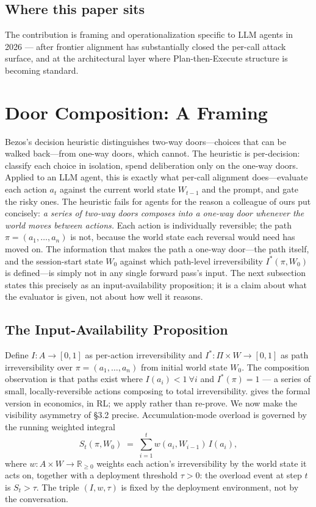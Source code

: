 \documentclass[11pt]{article}
\begin{document}
\subsection{Where this paper sits}

The contribution is framing and operationalization specific to LLM agents in 2026 --- after frontier alignment has substantially closed the per-call attack surface, and at the architectural layer where Plan-then-Execute structure is becoming standard.

\section{Door Composition: A Framing}
\label{sec:framing}

Bezos's decision heuristic distinguishes two-way doors---choices that can be walked back---from one-way doors, which cannot. The heuristic is per-decision: classify each choice in isolation, spend deliberation only on the one-way doors. Applied to an LLM agent, this is exactly what per-call alignment does---evaluate each action $a_t$ against the current world state $W_{t-1}$ and the prompt, and gate the risky ones. The heuristic fails for agents for the reason a colleague of ours put concisely: \emph{a series of two-way doors composes into a one-way door whenever the world moves between actions.} Each action is individually reversible; the path $\pi = (a_1, \ldots, a_n)$ is not, because the world state each reversal would need has moved on. The information that makes the path a one-way door---the path itself, and the session-start state $W_0$ against which path-level irreversibility $I^*(\pi, W_0)$ is defined---is simply not in any single forward pass's input. The next subsection states this precisely as an input-availability proposition; it is a claim about what the evaluator is given, not about how well it reasons.

\subsection{The Input-Availability Proposition}
\label{sec:input-availability}

Define $I: A \to [0, 1]$ as per-action irreversibility and $I^*: \Pi \times W \to [0, 1]$ as path irreversibility over $\pi = (a_1,\ldots,a_n)$ from initial world state $W_0$. The composition observation is that paths exist where $I(a_i) < 1\ \forall i$ and $I^*(\pi) = 1$ --- a series of small, locally-reversible actions composing to total irreversibility. \citet{arthur1989} gives the formal version in economics, \citet{krakovna2018} in RL; we apply rather than re-prove. We now make the visibility asymmetry of §3.2 precise. Accumulation-mode overload is governed by the running weighted integral
\[
  S_t(\pi, W_0) \;=\; \sum_{i=1}^{t} w(a_i, W_{i-1})\, I(a_i),
\]
where $w: A \times W \to \mathbb{R}_{\ge 0}$ weights each action's irreversibility by the world state it acts on, together with a deployment threshold $\tau > 0$: the overload event at step $t$ is $S_t > \tau$. The triple $(I, w, \tau)$ is fixed by the deployment environment, not by the conversation.
\end{document}
